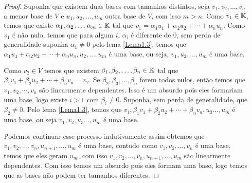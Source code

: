 \begin{proof}
Suponha que existem duas bases com tamanhos distintos, seja $v_1,\allowbreak v_2,\allowbreak \dots, \allowbreak v_n$ a menor base de $V$ e $u_1,u_2,\dots,u_m$ outra base de $V$, com isso $m>n$.
Como $v_1 \in \mathbb{K}$, temos que existe $\alpha_1,\alpha_2\dots,\alpha_m \in \mathbb{K}$ tal que $v_1 = \alpha_1 u_1 + \alpha_2 u_2 + \cdots + \alpha_n u_n$.
Como $v_1$ é não nulo, temos que para algum $i$, $\alpha_i$ é diferente de 0, sem perda de generalidade suponha $\alpha_1 \ne 0$
 pelo lema \ref{Lema1.3}, temos que  $\alpha_1 u_1 + \alpha_2 u_2 + \cdots + \alpha_n u_n,u_2,\dots,u_m$ é uma base, ou seja, $v_1,u_2,\dots,u_m$ é uma base.
 
Como $v_2 \in V$ temos que existem $\beta_1,\beta_2,\dots,\beta_n \in \mathbb{K}$ tal que $\beta_1 v_1 + \beta_2 u_2 + \cdots + \beta_n v_n = v_2$.
Se $\beta_2, \beta_3, \dots, \beta_n$ forem todos nulos, então temos que $v_1, v_2, \cdots, v_n$ são linearmente dependentes. Isso é um absurdo pois eles formariam uma base, logo existe $i>1$ com $\beta_i \neq 0$.
Suponha, sem perda de generalidade, que $\beta_2 \ne 0$. Pelo lema \ref{Lema1.3}, temos que $v_1,\beta_1 v_1 + \beta_2 u_2 + \cdots + \beta_n v_n,u_3\dots,u_m$ é uma base, ou seja $v_1,v_2,u_3\dots,u_m$ é uma base.

Podemos continuar esse processo indutivamente assim obtemos que $v_1, \allowbreak v_2, \allowbreak \dots, \allowbreak v_n, \allowbreak u_{n+1}, \allowbreak \dots, \allowbreak u_m$ é uma base,
contudo como $v_1,v_2,\dots,v_n$ é uma base, temos que eles geram $u_m$, com isso $v_1,v_2,\dots,v_n,u_{n+1},\dots,u_m$ são linearmente dependentes. Com isso temos um absurdo pois eles formam uma base, logo temos que as bases não podem ter tamanhos diferentes.
\end{proof}

